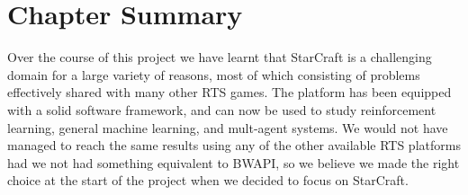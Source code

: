 \section{Chapter Summary}

Over the course of this project we have learnt that StarCraft is a challenging
domain for a large variety of reasons, most of which consisting of problems
effectively shared with many other RTS games. The platform has been equipped
with a solid software framework, and can now be used to study reinforcement
learning, general machine learning, and mult-agent systems. We would not have
managed to reach the same results using any of the other available RTS platforms
had we not had something equivalent to BWAPI, so we believe we made the right
choice at the start of the project when we decided to focus on StarCraft.
 